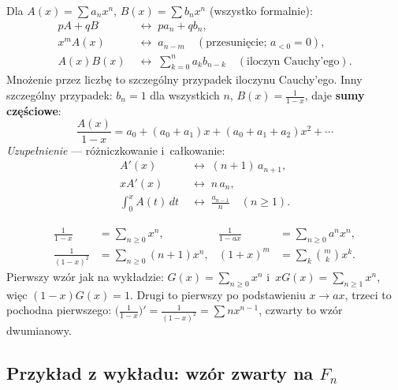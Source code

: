 \documentclass[11pt]{article}
\begin{document}
\begin{fakt}\label{fakt:slownik}
Dla $A(x)=\sum a_nx^n$, $B(x)=\sum b_nx^n$ (wszystko formalnie):
\begin{align*}
pA+qB&\;\leftrightarrow\;pa_n+qb_n,\\
x^mA(x)&\;\leftrightarrow\;a_{n-m}\quad(\text{przesunięcie; } a_{<0}=0),\\
A(x)B(x)&\;\leftrightarrow\;\sum_{k=0}^na_kb_{n-k}\quad(\text{iloczyn Cauchy'ego}).
\end{align*}
Mnożenie przez liczbę to szczególny przypadek iloczynu Cauchy'ego. Inny
szczególny przypadek: $b_n=1$ dla wszystkich $n$, $B(x)=\frac1{1-x}$, daje
\textbf{sumy częściowe}:
\[
\frac{A(x)}{1-x}=a_0+(a_0+a_1)x+(a_0+a_1+a_2)x^2+\cdots
\]
\emph{Uzupełnienie} --- różniczkowanie i~całkowanie:
\begin{align*}
A'(x)&\;\leftrightarrow\;(n+1)\,a_{n+1},\\
xA'(x)&\;\leftrightarrow\;n\,a_n,\\
\int_0^xA(t)\,dt&\;\leftrightarrow\;\frac{a_{n-1}}{n}\quad(n\ge1).
\end{align*}
\end{fakt}

\begin{fakt}\label{fakt:szeregi}
\begin{align*}
\frac1{1-x}&=\sum_{n\ge0}x^n,&
\frac1{1-ax}&=\sum_{n\ge0}a^nx^n,\\
\frac1{(1-x)^2}&=\sum_{n\ge0}(n+1)x^n,&
(1+x)^m&=\sum_{k}\binom mkx^k.
\end{align*}
Pierwszy wzór jak na wykładzie: $G(x)=\sum_{n\ge0}x^n$ i~$xG(x)=\sum_{n\ge1}x^n$,
więc $(1-x)G(x)=1$. Drugi to pierwszy po podstawieniu $x\to ax$, trzeci to pochodna
pierwszego: $\bigl(\frac1{1-x}\bigr)'=\frac1{(1-x)^2}=\sum nx^{n-1}$, czwarty
to wzór dwumianowy.
\end{fakt}

\subsection*{Przykład z wykładu: wzór zwarty na \texorpdfstring{$F_n$}{F(n)}}
\end{document}
